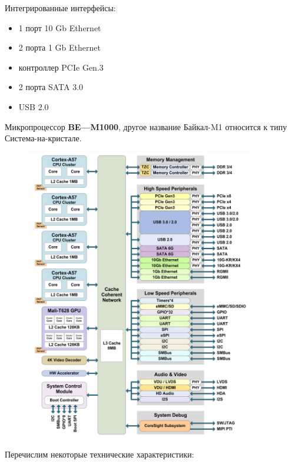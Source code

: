 \documentclass[10pt, a5paper]{article}
\begin{document}
Интегрированные интерфейсы:

\begin{itemize}
  \item 1 порт 10 Gb Ethernet
  \item 2 порта 1 Gb Ethernet
  \item контроллер PCIe Gen.3
  \item 2 порта SATA 3.0
  \item USB 2.0
\end{itemize}

Микропроцессор \textbf{BE---M1000}, другое название Байкал-M1 относится к типу Система-на-кристале.

\begin{center}
\begin{figure}[h!]
  \centering
  \includegraphics[width=10cm]{Stavtsev2}  
  \label{stavtsev:fig2}
\end{figure}
\end{center} 

Перечислим некоторые технические характеристики:
\end{document}

